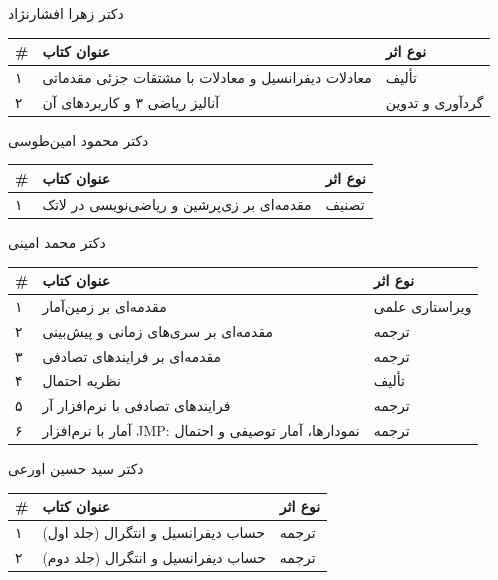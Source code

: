 \documentclass[
  letterpaper,
  DIV=11,
  numbers=noendperiod]{scrreprt}
\newcounter{none} %
\begin{document}
دکتر زهرا افشارنژاد

{\def\LTcaptype{none} %
\begin{longtable}[]{@{}lll@{}}
\toprule\noalign{}
\# & عنوان کتاب & نوع اثر \\
\midrule\noalign{}
\endhead
\bottomrule\noalign{}
\endlastfoot
۱ & معادلات دیفرانسیل و معادلات با مشتقات جزئی مقدماتی & تألیف \\
۲ & آنالیز ریاضی ۳ و کاربردهای آن & گردآوری و تدوین \\
\end{longtable}
}

دکتر محمود امین‌طوسی

{\def\LTcaptype{none} %
\begin{longtable}[]{@{}lll@{}}
\toprule\noalign{}
\# & عنوان کتاب & نوع اثر \\
\midrule\noalign{}
\endhead
\bottomrule\noalign{}
\endlastfoot
۱ & مقدمه‌ای بر زی‌پرشین و ریاضی‌نویسی در لاتک & تصنیف \\
\end{longtable}
}

دکتر محمد امینی

{\def\LTcaptype{none} %
\begin{longtable}[]{@{}lll@{}}
\toprule\noalign{}
\# & عنوان کتاب & نوع اثر \\
\midrule\noalign{}
\endhead
\bottomrule\noalign{}
\endlastfoot
۱ & مقدمه‌ای بر زمین‌آمار & ویراستاری علمی \\
۲ & مقدمه‌ای بر سری‌های زمانی و پیش‌بینی & ترجمه \\
۳ & مقدمه‌ای بر فرایندهای تصادفی & ترجمه \\
۴ & نظریه احتمال & تألیف \\
۵ & فرایندهای تصادفی با نرم‌افزار آر & ترجمه \\
۶ & آمار با نرم‌افزار JMP: نمودارها، آمار توصیفی و احتمال & ترجمه \\
\end{longtable}
}

دکتر سید حسین اورعی

{\def\LTcaptype{none} %
\begin{longtable}[]{@{}lll@{}}
\toprule\noalign{}
\# & عنوان کتاب & نوع اثر \\
\midrule\noalign{}
\endhead
\bottomrule\noalign{}
\endlastfoot
۱ & حساب دیفرانسیل و انتگرال (جلد اول) & ترجمه \\
۲ & حساب دیفرانسیل و انتگرال (جلد دوم) & ترجمه \\
\end{longtable}
}
\end{document}
